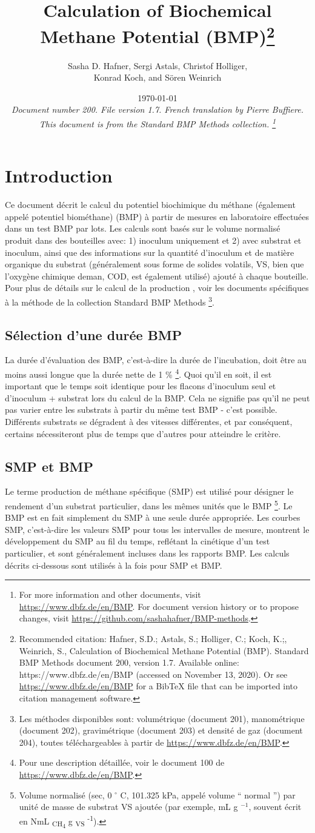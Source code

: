 \documentclass[]{article}
\title {Calculation of Biochemical Methane Potential (BMP)\footnote{
  Recommended citation: 
Hafner, S.D.; Astals, S.; Holliger, C.; Koch, K.;, Weinrich, S., Calculation of Biochemical Methane Potential (BMP). Standard BMP Methods document 200, version 1.7. Available online: https://www.dbfz.de/en/BMP (accessed on November 13, 2020).
\newline
  Or see \url{https://www.dbfz.de/en/BMP} for a BibTeX file that can be imported into citation management software.
}}
\author{Sasha D. Hafner, Sergi Astals, Christof Holliger, \\ Konrad Koch, and S{\"o}ren Weinrich}
\date{\today \\
\bigskip
\textit{
  Document number 200.
  File version 1.7. 
  French translation by Pierre Buffiere.
  This document is from the Standard BMP Methods collection.
    \footnote{For more information and other documents, visit \url{https://www.dbfz.de/en/BMP}. 
    For document version history or to propose changes, visit \url{https://github.com/sashahafner/BMP-methods}.}
}
}
\begin{document}
\maketitle

\section{Introduction}
Ce document décrit le calcul du potentiel biochimique du méthane (également appelé potentiel biométhane) (BMP) à partir de mesures en laboratoire effectuées dans un test BMP par lots.
Les calculs sont basés sur le volume normalisé  produit dans des bouteilles avec: 1) inoculum uniquement et 2) avec substrat et inoculum, ainsi que des informations sur la quantité d'inoculum et de matière organique du substrat (généralement sous forme de solides volatils, VS, bien que l'oxygène chimique deman, COD, est également utilisé) ajouté à chaque bouteille.
Pour plus de détails sur le calcul de la production , voir les documents spécifiques à la méthode de la collection Standard BMP Methods \footnote{
  Les méthodes disponibles sont: volumétrique (document 201), manométrique (document 202), gravimétrique (document 203) et densité de gaz (document 204), toutes téléchargeables à partir de \url{https://www.dbfz.de/en/BMP}.
}.

\subsection{Sélection d'une durée BMP}
La durée d’évaluation des BMP, c’est-à-dire la durée de l’incubation, doit être au moins aussi longue que la durée nette de 1 \% \footnote{
  Pour une description détaillée, voir le document 100 de \url{https://www.dbfz.de/en/BMP}.
}.
Quoi qu'il en soit, il est important que le temps soit identique pour les flacons d'inoculum seul et d'inoculum + substrat lors du calcul de la BMP.
Cela ne signifie pas qu'il ne peut pas varier entre les substrats à partir du même test BMP - c'est possible.
Différents substrats se dégradent à des vitesses différentes, et par conséquent, certains nécessiteront plus de temps que d'autres pour atteindre le critère.

\subsection{SMP et BMP}
Le terme production de méthane spécifique (SMP) est utilisé pour désigner le rendement  d'un substrat particulier, dans les mêmes unités que le BMP \footnote{
  Volume normalisé  (sec, 0 $^\circ$ C, 101.325 kPa, appelé volume `` normal '') par unité de masse de substrat VS ajoutée (par exemple, mL g $^{-1}$, souvent écrit en NmL \textsubscript{CH\textsubscript{4} } g \textsubscript{VS} \textsuperscript{-1}).
}.
Le BMP est en fait simplement du SMP à une seule durée appropriée.
Les courbes SMP, c'est-à-dire les valeurs SMP pour tous les intervalles de mesure, montrent le développement du SMP au fil du temps, reflétant la cinétique d'un test particulier, et sont généralement incluses dans les rapports BMP.
Les calculs décrits ci-dessous sont utilisés à la fois pour SMP et BMP.
\end{document}
